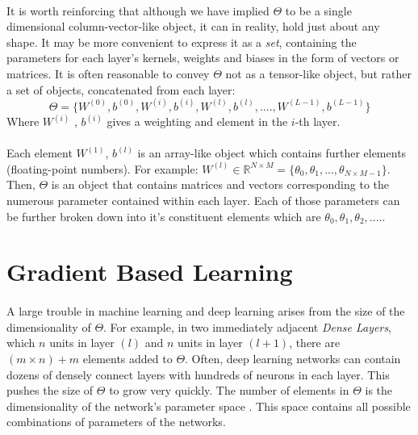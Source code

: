 \documentclass[12pt,letterpaper]{article}
\begin{document}
\paragraph*{}It is worth reinforcing that although we have implied $\Theta$ to be a single dimensional column-vector-like object, it can in reality, hold just about any shape. It may be more convenient to express it as a \textit{set}, containing the parameters for each layer's kernels, weights and biases in the form of vectors or matrices. It is often reasonable to convey $\Theta$ not as a tensor-like object, but rather a set of objects, concatenated from each layer: 
\begin{equation}
\label{THETA}
\Theta = \big\{ W^{(0)} , b^{(0)} , W^{(i)} , b^{(i)}, W^{(l)} , b^{(l)}, ....,
W^{(L-1)} , b^{(L-1)} \big\} 
\end{equation}
Where $W^{(i)}$ , $b^{(i)}$ gives a weighting and element in the $i$-th layer. 

\paragraph*{}Each element  $W^{(1)}$, $b^{(l)}$ is an array-like object which contains further elements (floating-point numbers). For example: 
$W^{(l)} \in \mathbb{R}^{N \times M} = \big\{ \theta_0 , \theta_1 , ... , \theta_{N \times M - 1} \big\}$. Then, $\Theta$ is an object that contains matrices and vectors corresponding to the numerous parameter contained within each layer. Each of those parameters can be further broken down into it's constituent elements which are $\theta_0 , \theta_1 , \theta_2 , .... $. 




\section{Gradient Based Learning}

\paragraph*{}A large trouble in machine learning and deep learning arises from the size of the dimensionality of $\Theta$. For example, in two immediately adjacent \textit{Dense Layers}, which $n$ units in layer $(l)$ and $n$ units in layer $(l+1)$, there are $(m \times n) + m$ elements added to $\Theta$. Often, deep learning networks can contain dozens of densely connect layers with hundreds of neurons in each layer. This pushes the size of $\Theta$ to grow very quickly. The number of elements in $\Theta$ is the dimensionality of the network's parameter space \cite{Goodfellow}. This space contains all possible combinations of parameters of the networks.
\end{document}
